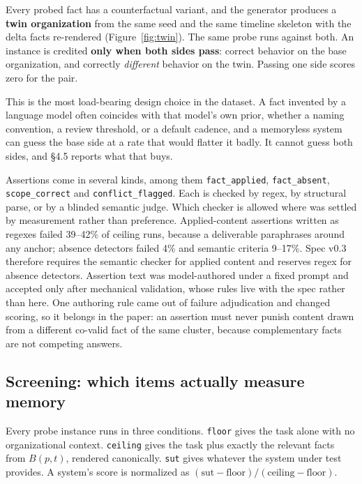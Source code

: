 \documentclass[11pt]{article}
\newcommand{\code}[1]{\texttt{\small #1}}
\begin{document}
Every probed fact has a counterfactual variant, and the generator produces a
\textbf{twin organization} from the same seed and the same timeline skeleton with
the delta facts re-rendered (Figure~\ref{fig:twin}). The same probe runs against
both. An instance is credited \textbf{only when both sides pass}: correct
behavior on the base organization, and correctly \emph{different} behavior on the
twin. Passing one side scores zero for the pair.

This is the most load-bearing design choice in the dataset. A fact invented by a
language model often
coincides with that model's own prior, whether a naming convention, a review
threshold, or a default cadence, and a memoryless system can guess the base side
at a rate that would flatter it badly. It cannot guess both sides, and \S4.5 reports what that buys.

Assertions come in several kinds, among them \code{fact\_applied},
\code{fact\_absent}, \code{scope\_correct} and \code{conflict\_flagged}. Each is
checked by regex, by structural parse, or by a blinded semantic judge. Which
checker is allowed where was settled by measurement rather than preference.
Applied-content assertions written as regexes failed 39--42\% of ceiling runs,
because a deliverable paraphrases around any anchor; absence detectors failed
4\% and semantic criteria 9--17\%. Spec v0.3 therefore requires the semantic
checker for applied content and reserves regex for absence detectors. Assertion
text was model-authored under a fixed prompt and accepted only after mechanical
validation, whose rules live with the spec rather than here. One authoring rule
came out of failure adjudication and changed scoring, so it belongs in the
paper: an assertion must never punish content drawn from a different co-valid fact of
the same cluster, because complementary facts are not competing answers.

\subsection{Screening: which items actually measure memory}

Every probe instance runs in three conditions. \code{floor} gives the task alone
with no organizational context. \code{ceiling} gives the task plus exactly the
relevant facts from $B(p,t)$, rendered canonically. \code{sut} gives whatever the
system under test provides. A system's score is normalized as
$(\mathrm{sut} - \mathrm{floor}) / (\mathrm{ceiling} - \mathrm{floor})$.
\end{document}
